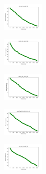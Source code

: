 \vspace*{\fill}
\newpage
\vspace*{\fill}

\begin{figure}[H]
    \centering
    \begin{subfigure}
        \centering
        \includegraphics[width=0.234\textwidth]{img/agesf/iris_set_const_10_949004259_cost.png}
    \end{subfigure}
    \hfill
    \begin{subfigure}
        \centering
        \includegraphics[width=0.234\textwidth]{img/agesf/ecoli_set_const_10_949004259_cost.png}
    \end{subfigure}
    \hfill
    \begin{subfigure}
        \centering
        \includegraphics[width=0.234\textwidth]{img/agesf/rand_set_const_10_949004259_cost.png}
    \end{subfigure}
    \hfill
    \begin{subfigure}
        \centering
        \includegraphics[width=0.234\textwidth]{img/agesf/newthyroid_set_const_10_949004259_cost.png}
    \end{subfigure}
    \hfill
    \begin{subfigure}
        \centering
        \includegraphics[width=0.234\textwidth]{img/agesf/iris_set_const_10_589741062_cost.png}

\end{subfigure}
\end{figure}
